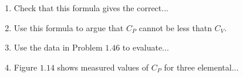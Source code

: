 \documentclass[fleqn]{article}
\begin{document}
\begin{enumerate}
\begin{enumerate}
      \item Check that this formula gives the correct...


      \item Use this formula to argue that $C_P$ cannot be less thatn $C_V$.


      \item Use the data in Problem $1.46$ to evaluate...


      \item Figure $1.14$ shows measured values of $C_P$ for three elemental...


    \end{enumerate}

  \end{enumerate}
\end{document}
